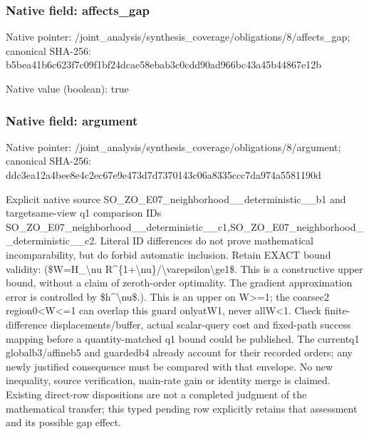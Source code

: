 \documentclass[10pt,a4paper]{article}
\begin{document}
\subsubsection{Native field: affects\_\allowbreak{}gap}
Native pointer: /joint\_\allowbreak{}analysis/synthesis\_\allowbreak{}coverage/obligations/8/affects\_\allowbreak{}gap; canonical SHA-256: b5bea41b6c623f7c09f1bf24dcae58ebab3c0cdd90ad966bc43a45b44867e12b

Native value (boolean): true

\subsubsection{Native field: argument}
Native pointer: /joint\_\allowbreak{}analysis/synthesis\_\allowbreak{}coverage/obligations/8/argument; canonical SHA-256: ddc3ea12a4bee8e4c2ec67e9e473d7d7370143c06a8335ccc7da974a5581190d

\begingroup\raggedright\sloppy Explicit native source SO\_\allowbreak{}ZO\_\allowbreak{}E07\_\allowbreak{}neighborhood\_\allowbreak{}\_\allowbreak{}deterministic\_\allowbreak{}\_\allowbreak{}b1 and targetsame-view q1 comparison IDs SO\_\allowbreak{}ZO\_\allowbreak{}E07\_\allowbreak{}neighborhood\_\allowbreak{}\_\allowbreak{}deterministic\_\allowbreak{}\_\allowbreak{}c1,\allowbreak{}SO\_\allowbreak{}ZO\_\allowbreak{}E07\_\allowbreak{}neighborhood\_\allowbreak{}\_\allowbreak{}deterministic\_\allowbreak{}\_\allowbreak{}c2. Literal ID differences do not prove mathematical incomparability,\allowbreak{} but do forbid automatic inclusion. Retain EXACT bound validity:\allowbreak{} (\$W=\allowbreak{}H\_\allowbreak{}\textbackslash{}nu R\textasciicircum{}\{1+\textbackslash{}nu\}/\allowbreak{}\textbackslash{}varepsilon\textbackslash{}ge1\$. This is a constructive upper bound,\allowbreak{} without a claim of zeroth-order optimality. The gradient approximation error is controlled by \$h\textasciicircum{}\textbackslash{}nu\$.). This is an upper on W>=\allowbreak{}1;\allowbreak{} the coarsec2 region0<W<=\allowbreak{}1 can overlap this guard onlyatW1,\allowbreak{} never allW<1. Check finite-difference displacements/\allowbreak{}buffer,\allowbreak{} actual scalar-query cost and fixed-path success mapping before a quantity-matched q1 bound could be published. The currentq1 globalb3/\allowbreak{}affineb5 and guardedb4 already account for their recorded orders;\allowbreak{} any newly justified consequence must be compared with that envelope. No new inequality,\allowbreak{} source verification,\allowbreak{} main-rate gain or identity merge is claimed. Existing direct-row dispositions are not a completed judgment of the mathematical transfer;\allowbreak{} this typed pending row explicitly retains that assessment and its possible gap effect.\par\endgroup
\end{document}
